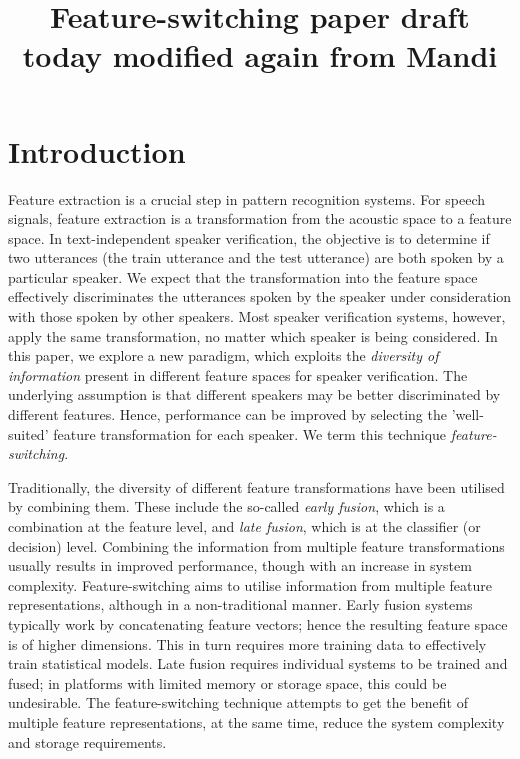 \documentclass{article}
\title{Feature-switching paper draft today modified again from Mandi}
\begin{document}
\section{Introduction}
\label{sec:intro}
Feature extraction is a crucial step in pattern recognition systems. For
speech signals, feature extraction is a transformation from the acoustic space
to a feature space. In text-independent speaker verification, the objective is
to determine if two utterances (the train utterance and the test utterance) are
both spoken by a particular speaker. We expect that the transformation into the
feature space effectively discriminates the utterances spoken by the speaker
under consideration with those spoken by other speakers. Most speaker
verification systems, however, apply the same transformation, no matter which
speaker is being considered. In this paper, we explore a new paradigm, which
exploits the \emph{diversity of information} present in different feature spaces
for speaker verification. The underlying assumption is that different speakers
may be better discriminated by different features. Hence, performance can
be improved by selecting the 'well-suited' feature transformation for
each speaker. We term this technique \emph{feature-switching}. 

Traditionally, the diversity of different feature transformations have been
utilised by combining them. These include the so-called \emph{early fusion},
which is a combination at the feature level, and \emph{late fusion}, which is at
the classifier (or decision) level. Combining the information from multiple
feature transformations usually results in improved performance, though
with an increase in system complexity. Feature-switching aims to utilise
information from multiple feature representations, although in a non-traditional
manner. Early fusion systems typically work by concatenating feature vectors;
hence the resulting feature space is of higher dimensions. This in turn requires
more training data to effectively train statistical models. Late fusion requires
individual systems to be trained and fused; in platforms with limited memory or
storage space, this could be undesirable. The feature-switching technique
attempts to get the benefit of multiple feature representations, at the same
time, reduce the system complexity and storage requirements.
\end{document}
